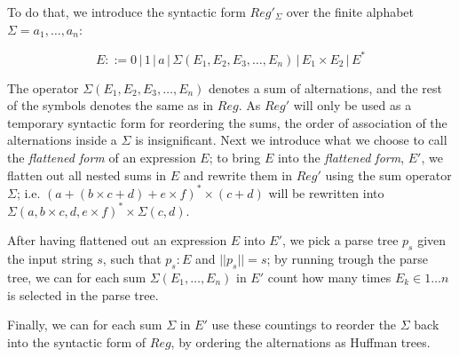 \documentclass[a4paper, oneside]{memoir}
\theoremstyle{definition}
\begin{document}
To do that, we introduce the syntactic form $Reg'_\Sigma$ over the finite alphabet $\Sigma = {a_1, \dots, a_n}$:

\[
    E ::= 0 \, | \, 1 \, | \, a \, | \, \Sigma(E_1, E_2, E_3, \dots, E_n) \, | \, E_1 \times E_2 \, | \, E^{*}
\]

The operator $\Sigma(E_1, E_2, E_3, \dots, E_n)$ denotes a sum of alternations, and the rest of the symbols denotes the same as in $Reg$. As $Reg'$ will only be used as a temporary syntactic form for reordering the sums, the order of association of the alternations inside a $\Sigma$ is insignificant.
Next we introduce what we choose to call the \emph{flattened form} of an expression $E$; to bring $E$ into the \emph{flattened form}, $E'$, we flatten out all nested sums in $E$ and rewrite them in $Reg'$ using the sum operator $\Sigma$; i.e. $(a + (b \times c + d) + e \times f)^{*} \times (c + d)$ will be rewritten into $\Sigma(a, b \times c, d, e \times f)^{*} \times \Sigma{(c, d)}$.

After having flattened out an expression $E$ into $E'$, we pick a parse tree $p_s$ given the input string $s$, such that $p_s : E$ and $||p_s|| = s$; by running trough the parse tree, we can for each sum $\Sigma(E_1, \dots, E_n)$ in $E'$ count how many times $E_k \in 1 \dots n$ is selected in the parse tree.

Finally, we can for each sum $\Sigma$ in $E'$ use these countings to reorder the $\Sigma$ back into the syntactic form of $Reg$, by ordering the alternations as Huffman trees.
\end{document}
